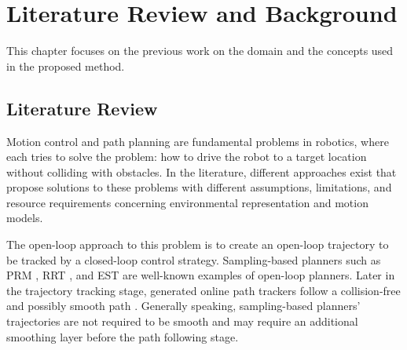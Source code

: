 \chapter{Literature Review and Background}
\label{chapter:background}

This chapter focuses on the previous work on the domain and the concepts used in the proposed method.

\section{Literature Review}
\label{section:literature}
Motion control and path planning are fundamental problems in robotics, where each tries to solve the problem: how to drive the robot to a target location without colliding with obstacles. 
In the literature, different approaches exist that propose solutions to these problems with different assumptions, limitations, and resource requirements concerning environmental representation and motion models.

The open-loop approach to this problem is to create an open-loop trajectory to be tracked by a closed-loop control strategy. Sampling-based planners such as PRM \cite{Kavraki1996}, RRT \cite{rrt2001}, and EST \cite{Est1999} are well-known examples of open-loop planners. 
Later in the trajectory tracking stage, generated online path trackers follow a collision-free and possibly smooth path \cite{camacho2004} \cite{Amidi1991}. 
Generally speaking, sampling-based planners' trajectories are not required to be smooth and may require an additional smoothing layer before the path following stage. %

